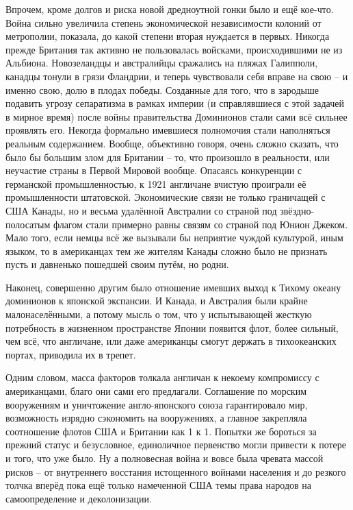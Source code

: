 Впрочем, кроме долгов и риска новой дредноутной гонки было и ещё кое-что. Война сильно увеличила степень экономической независимости колоний от метрополии, показала, до какой степени вторая нуждается в первых. Никогда прежде Британия так активно не пользовалась войсками, происходившими не из Альбиона. Новозеландцы и австралийцы сражались на пляжах Галипполи, канадцы тонули в грязи Фландрии, и теперь чувствовали себя вправе на свою – и именно свою, долю в плодах победы. Созданные для того, что в зародыше подавить угрозу сепаратизма в рамках империи (и справлявшиеся с этой задачей в мирное время) после войны правительства Доминионов стали сами всё сильнее проявлять его. Некогда формально имевшиеся полномочия стали наполняться реальным содержанием. Вообще, объективно говоря, очень сложно сказать, что было бы большим злом для Британии – то, что произошло в реальности, или неучастие страны в Первой Мировой вообще. Опасаясь конкуренции с германской промышленностью, к 1921 англичане вчистую проиграли её промышленности штатовской. Экономические связи не только граничащей с США Канады, но и весьма удалённой Австралии со страной под звёздно-полосатым флагом стали примерно равны связям со страной под Юнион Джеком. Мало того, если немцы всё же вызывали бы неприятие чуждой культурой, иным языком, то в американцах тем же жителям Канады сложно было не признать пусть и давненько пошедшей своим путём, но родни.

Наконец, совершенно другим было отношение имевших выход к Тихому океану доминионов к японской экспансии. И Канада, и Австралия были крайне малонаселёнными, а потому мысль о том, что у испытывающей жесткую потребность в жизненном пространстве Японии появится флот, более сильный, чем всё, что англичане, или даже американцы смогут держать в тихоокеанских портах, приводила их в трепет.

Одним словом, масса факторов толкала англичан к некоему компромиссу с американцами, благо они сами его предлагали. Соглашение по морским вооружениям и уничтожение англо-японского союза гарантировало мир, возможность изрядно сэкономить на вооружениях, а главное закрепляла соотношение флотов США и Британии как 1 к 1. Попытки же бороться за прежний статус и безусловное, единоличное первенство могли привести к потере и того, что уже было. Ну а полновесная война и вовсе была чревата массой рисков – от внутреннего восстания истощенного войнами населения и до резкого толчка вперёд пока ещё только намеченной США темы права народов на самоопределение и деколонизации.

